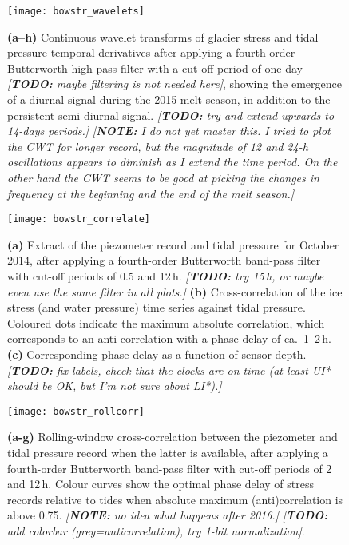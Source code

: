 \documentclass[utf8]{article}
\newcommand{\note}[1]{\textcolor{c0}{\emph{[\textbf{NOTE:} #1]}}}
\newcommand{\todo}[1]{\textcolor{c3}{\emph{[\textbf{TODO:} #1]}}}
\begin{document}
    \begin{figure}
      \centerline{\texttt{[image: bowstr\_wavelets]}}
      \caption{%
        \textbf{(a--h)}
          Continuous wavelet transforms of glacier stress and tidal pressure
          temporal derivatives after applying a fourth-order Butterworth
          high-pass filter with a cut-off period of one day \todo{maybe
          filtering is not needed here}, showing the emergence of a diurnal
          signal during the 2015 melt season, in addition to the persistent
          semi-diurnal signal.
          \todo{%
            try and extend upwards to 14-days periods.}
          \note{%
            I do not yet master this. I tried to plot the CWT for longer
            record, but the magnitude of 12 and 24-h oscillations appears to
            diminish as I extend the time period. On the other hand the CWT
            seems to be good at picking the changes in frequency at the
            beginning and the end of the melt season.}}
      \label{fig:wavelets}
    \end{figure}

    \begin{figure}
      \centerline{\texttt{[image: bowstr\_correlate]}}
      \caption{%
        \textbf{(a)}
          Extract of the piezometer record and tidal pressure for October 2014,
          after applying a fourth-order Butterworth band-pass filter with
          cut-off periods of 0.5 and 12\,h.
          \todo{try 15\,h, or maybe even use the same filter in all plots.}
        \textbf{(b)}
          Cross-correlation of the ice stress (and water pressure) time series
          against tidal pressure. Coloured dots indicate the maximum absolute
          correlation, which corresponds to an anti-correlation with a phase
          delay of ca.~1--2\,h.
        \textbf{(c)}
          Corresponding phase delay as a function of sensor depth.
        \todo{
          fix labels, check that the clocks are on-time (at least UI* should be
          OK, but I'm not sure about LI*).}}
      \label{fig:correlate}
    \end{figure}

    \begin{figure}
      \centerline{\texttt{[image: bowstr\_rollcorr]}}
      \caption{%
        \textbf{(a-g)}
          Rolling-window cross-correlation between the piezometer and tidal
          pressure record when the latter is available, after applying a
          fourth-order Butterworth band-pass filter with cut-off periods of 2
          and 12\,h. Colour curves show the optimal phase delay of stress
          records relative to tides when absolute maximum (anti)correlation is
          above 0.75.
          \note{no idea what happens after 2016.}
          \todo{add colorbar (grey=anticorrelation), try 1-bit normalization}.}
      \label{fig:rollcorr}
    \end{figure}



\end{document}
